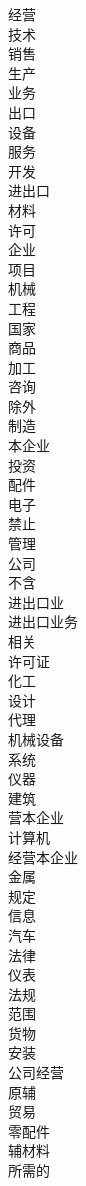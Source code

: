\documentclass[12pt,a4paper]{article}
\begin{document}
\begin{CJK*}{UTF8}{song}
\begin{multicols}{5}
经营\\
技术\\
销售\\
生产\\
业务\\
出口\\
设备\\
服务\\
开发\\
进出口\\
材料\\
许可\\
企业\\
项目\\
机械\\
工程\\
国家\\
商品\\
加工\\
咨询\\
除外\\
制造\\
本企业\\
投资\\
配件\\
电子\\
禁止\\
管理\\
公司\\
不含\\
进出口业\\
进出口业务\\
相关\\
许可证\\
化工\\
设计\\
代理\\
机械设备\\
系统\\
仪器\\
建筑\\
营本企业\\
计算机\\
经营本企业\\
金属\\
规定\\
信息\\
汽车\\
法律\\
仪表\\
法规\\
范围\\
货物\\
安装\\
公司经营\\
原辅\\
贸易\\
零配件\\
辅材料\\
所需的
\end{multicols}


\end{CJK*}
\end{document}

